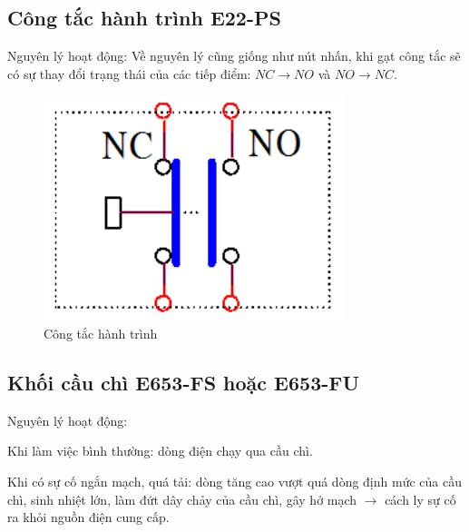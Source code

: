 \documentclass[13pt,a4paper]{extarticle}
\begin{document}
\subsection{Công tắc hành trình E22-PS}
Nguyên lý hoạt động: Về nguyên lý cũng giống như nút nhấn, khi gạt công tắc sẽ có sự thay đổi trạng thái của các tiếp điểm: $NC\rightarrow NO$ và $NO \rightarrow NC$.
\begin{figure}[!h]
\begin{center}
\includegraphics[scale=.6]{nut-nhan-4}
\end{center}
\caption{Công tắc hành trình}
\end{figure}
\newpage
\subsection{Khối cầu chì E653-FS hoặc E653-FU}
Nguyên lý hoạt động:
\begin{list}{--}{}
\item Khi làm việc bình thường: dòng điện chạy qua cầu chì.
\item Khi có sự cố ngắn mạch, quá tải: dòng tăng cao vượt quá dòng định mức của cầu chì, sinh nhiệt lớn, làm đứt dây chảy của cầu chì, gây hở mạch $\longrightarrow$ cách ly sự cố ra khỏi nguồn điện cung cấp.
\end{list}
\end{document}
